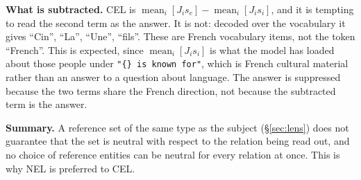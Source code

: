 \textbf{What is subtracted.} CEL is
$\operatorname{mean}_i[J_i s_e] - \operatorname{mean}_i[J_i s_i]$, and
it is tempting to read the second term as the answer. It is not: decoded
over the vocabulary it gives ``Cin'', ``La'', ``Une'', ``fils''. These are
French vocabulary items, not the token ``French''. This is expected, since
$\operatorname{mean}_i[J_i s_i]$ is what the model has loaded about those
people under \texttt{"\{\} is known for"}, which is French cultural
material rather than an answer to a question about language. The answer
is suppressed because the two terms share the French direction, not
because the subtracted term is the answer.

\textbf{Summary.} A reference set of the same type as the subject
(\S\ref{sec:lens}) does not guarantee that the set is neutral with
respect to the relation being read out, and no choice of reference
entities can be neutral for every relation at once. This is why
NEL is preferred to CEL.
